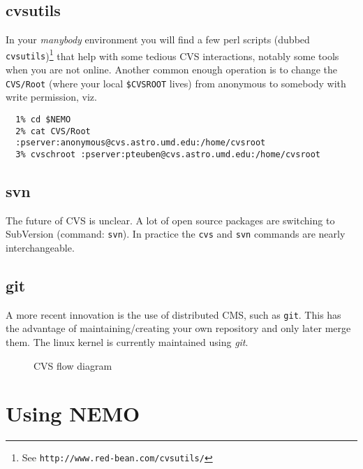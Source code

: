 \section{cvsutils}

In your {\it manybody} environment you will find a few perl scripts
(dubbed {\tt cvsutils})\footnote{See {\tt http://www.red-bean.com/cvsutils/}}
that help with some tedious CVS interactions, notably some tools when
you are not online. Another common enough operation is to change the 
{\tt CVS/Root}
(where your local {\tt \$CVSROOT} lives) from anonymous to somebody with
write permission, viz.

\footnotesize\begin{verbatim}
  1% cd $NEMO
  2% cat CVS/Root
  :pserver:anonymous@cvs.astro.umd.edu:/home/cvsroot
  3% cvschroot :pserver:pteuben@cvs.astro.umd.edu:/home/cvsroot
\end{verbatim}\normalsize

\section{svn}

The future of CVS is unclear. A lot of open source packages are  switching
to SubVersion (command: {\tt svn}). In practice the {\tt cvs} and 
{\tt svn} commands are nearly interchangeable.

\section{git}

A more recent innovation is the use of distributed CMS, such as {\tt git}. This
has the advantage of maintaining/creating your own repository and only later merge
them. The linux kernel is currently maintained using {\it git}.

\begin{figure}[htb]
\caption[CVS diagram]
{CVS flow diagram}
\label{f:cvs}
\end{figure}



\chapter                {Using NEMO}

